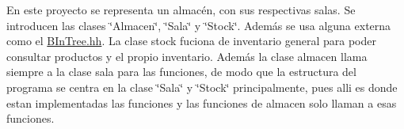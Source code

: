 En este proyecto se representa un almacén, con sus respectivas salas. Se introducen las clases \char`\"{}\+Almacen\char`\"{}, \char`\"{}\+Sala\char`\"{} y \char`\"{}\+Stock\char`\"{}. Además se usa alguna externa como el \mbox{\hyperlink{bintree_8hh}{B\+In\+Tree.\+hh}}. La clase stock fuciona de inventario general para poder consultar productos y el propio inventario. Además la clase almacen llama siempre a la clase sala para las funciones, de modo que la estructura del programa se centra en la clase \char`\"{}\+Sala\char`\"{} y \char`\"{}\+Stock\char`\"{} principalmente, pues alli es donde estan implementadas las funciones y las funciones de almacen solo llaman a esas funciones. 